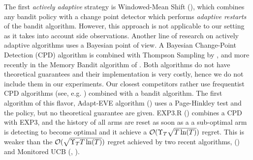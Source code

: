 %
The first \emph{actively adaptive} strategy is Windowed-Mean Shift (\cite{YuMannor09}), which combines any bandit policy with a change point detector which performs \emph{adaptive restarts} of the bandit algorithm. However, this approach is not applicable to our setting as it takes into account side observations. Another line of research on actively adaptive algorithms uses a Bayesian point of view.
A Bayesian Change-Point Detection (CPD) algorithm is combined with Thompson Sampling by \cite{MellorShapiro13}, and more recently in the Memory Bandit algorithm of \cite{Alami17}. Both algorithms do not have theoretical guarantees and their implementation is very costly, hence we do not include them in our experiments. Our closest competitors rather use frequentist CPD algorithms (see, e.g. \cite{Basseville93}) combined with a bandit algorithm.
%
The first algorithm of this flavor, Adapt-EVE algorithm (\cite{Hartland06}) uses a Page-Hinkley test and the \UCB{} policy, but no theoretical guarantee are given. EXP3.R (\cite{Allesiardo15,Allesiardo17}) combines a CPD with EXP3, and the history of all arms are reset as soon as a a sub-optimal arm is detecting to become optimal and it achieve a $\mathcal{O}(\Upsilon_T \sqrt{T \ln(T)})$ regret. This is weaker than the $\mathcal{O}(\sqrt{\Upsilon_T T \ln(T)})$ regret achieved by two recent algorithms, \CUSUMUCB{} (\cite{LiuLeeShroff17}) and Monitored UCB (\MUCB, \cite{CaoZhenKvetonXie18}).


